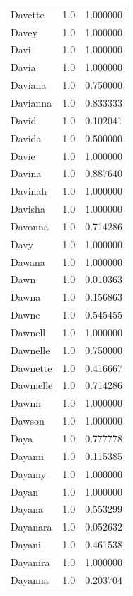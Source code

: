\documentclass[
  letterpaper,
  DIV=11,
  numbers=noendperiod]{scrreprt}
\begin{document}
\begin{tabular}{lrr}
Davette         &   1.0 &   1.000000 \\
Davey           &   1.0 &   1.000000 \\
Davi            &   1.0 &   1.000000 \\
Davia           &   1.0 &   1.000000 \\
Daviana         &   1.0 &   0.750000 \\
Davianna        &   1.0 &   0.833333 \\
David           &   1.0 &   0.102041 \\
Davida          &   1.0 &   0.500000 \\
Davie           &   1.0 &   1.000000 \\
Davina          &   1.0 &   0.887640 \\
Davinah         &   1.0 &   1.000000 \\
Davisha         &   1.0 &   1.000000 \\
Davonna         &   1.0 &   0.714286 \\
Davy            &   1.0 &   1.000000 \\
Dawana          &   1.0 &   1.000000 \\
Dawn            &   1.0 &   0.010363 \\
Dawna           &   1.0 &   0.156863 \\
Dawne           &   1.0 &   0.545455 \\
Dawnell         &   1.0 &   1.000000 \\
Dawnelle        &   1.0 &   0.750000 \\
Dawnette        &   1.0 &   0.416667 \\
Dawnielle       &   1.0 &   0.714286 \\
Dawnn           &   1.0 &   1.000000 \\
Dawson          &   1.0 &   1.000000 \\
Daya            &   1.0 &   0.777778 \\
Dayami          &   1.0 &   0.115385 \\
Dayamy          &   1.0 &   1.000000 \\
Dayan           &   1.0 &   1.000000 \\
Dayana          &   1.0 &   0.553299 \\
Dayanara        &   1.0 &   0.052632 \\
Dayani          &   1.0 &   0.461538 \\
Dayanira        &   1.0 &   1.000000 \\
Dayanna         &   1.0 &   0.203704 \\

\end{tabular}
\end{document}
